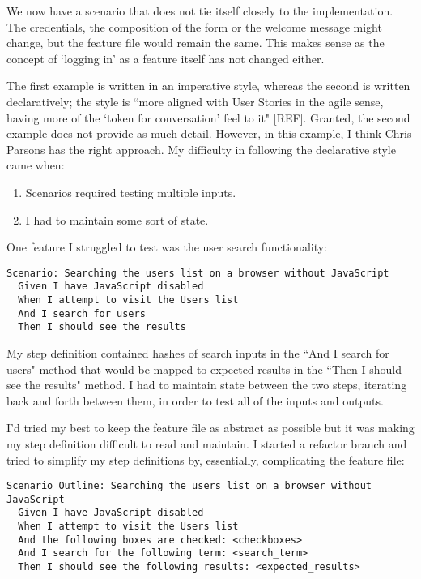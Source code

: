 We now have a scenario that does not tie itself closely to the implementation. The credentials, the composition of the form or the welcome message might change, but the feature file would remain the same. This makes sense as the concept of `logging in' as a feature itself has not changed either. 

The first example is written in an imperative style, whereas the second is written declaratively; the style is ``more aligned with User Stories in the agile sense, having more of the `token for conversation' feel to it" [REF]. Granted, the second example does not provide as much detail. However, in this example, I think Chris Parsons has the right approach.
My difficulty in following the declarative style came when: %

\begin{enumerate}
\item Scenarios required testing multiple inputs.
\item I had to maintain some sort of state.
\end{enumerate}

One feature I struggled to test was the user search functionality:

\begin{lstlisting}
Scenario: Searching the users list on a browser without JavaScript
  Given I have JavaScript disabled
  When I attempt to visit the Users list
  And I search for users
  Then I should see the results
 \end{lstlisting}

My step definition contained hashes of search inputs in the ``And I search for users" method that would be mapped to expected results in the ``Then I should see the results" method. I had to maintain state between the two steps, iterating back and forth between them, in order to test all of the inputs and outputs.

I'd tried my best to keep the feature file as abstract as possible but it was making my step definition difficult to read and maintain. I started a refactor branch and tried to simplify my step definitions by, essentially, complicating the feature file:

\begin{lstlisting}
Scenario Outline: Searching the users list on a browser without JavaScript
  Given I have JavaScript disabled
  When I attempt to visit the Users list
  And the following boxes are checked: <checkboxes>
  And I search for the following term: <search_term>
  Then I should see the following results: <expected_results>
\end{lstlisting}

